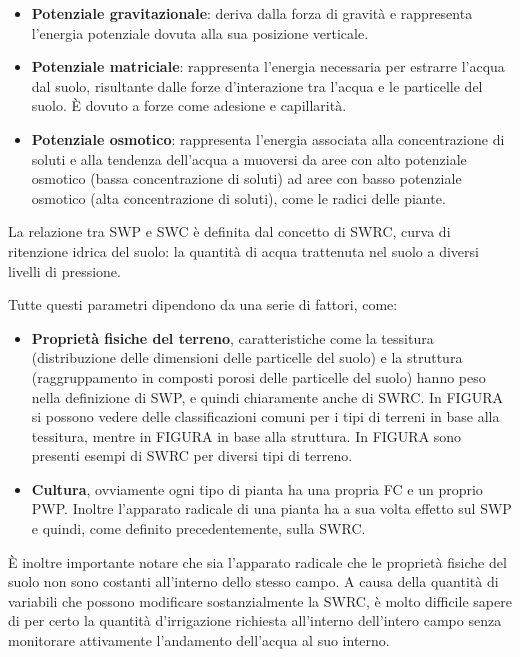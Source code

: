\documentclass[12pt,a4paper,openright,twoside]{book}
\begin{document}
\begin{itemize}
    \item \textbf{Potenziale gravitazionale}: deriva dalla forza di gravità e rappresenta l'energia potenziale dovuta alla sua posizione verticale.
    \item \textbf{Potenziale matriciale}:  rappresenta l'energia necessaria per estrarre l'acqua dal suolo, risultante dalle forze d'interazione tra l'acqua e le particelle del suolo. È dovuto a forze come adesione e capillarità.
    \item \textbf{Potenziale osmotico}: rappresenta l'energia associata alla concentrazione di soluti e alla tendenza dell'acqua a muoversi da aree con alto potenziale osmotico (bassa concentrazione di soluti) ad aree con basso potenziale osmotico (alta concentrazione di soluti), come le radici delle piante.
\end{itemize}

La relazione tra \ac{SWP} e \ac{SWC} è definita dal concetto di \ac{SWRC}, curva di ritenzione idrica del suolo: la quantità di acqua trattenuta nel suolo a diversi livelli di pressione.

Tutte questi parametri dipendono da una serie di fattori, come:
\begin{itemize}
    \item \textbf{Proprietà fisiche del terreno}, caratteristiche come la tessitura (distribuzione delle dimensioni delle particelle del suolo) e la struttura (raggruppamento in composti porosi delle particelle del suolo) hanno peso nella definizione di \ac{SWP}, e quindi chiaramente anche di \ac{SWRC}. In FIGURA si possono vedere delle classificazioni comuni per i tipi di terreni in base alla tessitura, mentre in FIGURA in base alla struttura. In FIGURA sono presenti esempi di \ac{SWRC} per diversi tipi di terreno.
    \item \textbf{Cultura}, ovviamente ogni tipo di pianta ha una propria \ac{FC} e un proprio \ac{PWP}. Inoltre l'apparato radicale di una pianta ha a sua volta effetto sul \ac{SWP} e quindi, come definito precedentemente, sulla \ac{SWRC}.
\end{itemize}

È inoltre importante notare che sia l'apparato radicale che le proprietà fisiche del suolo non sono costanti all'interno dello stesso campo. A causa della quantità di variabili che possono modificare sostanzialmente la \ac{SWRC}, è molto difficile sapere di per certo la quantità d'irrigazione richiesta all'interno dell'intero campo senza monitorare attivamente l'andamento dell'acqua al suo interno.
\end{document}
